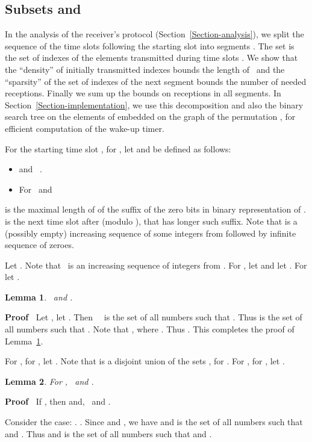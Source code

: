 \documentclass{article}
\newenvironment{proof}{\noindent\textbf{Proof\ }}{\hspace*{\fill}\medskip}
\newtheorem{lemma}{Lemma}
\begin{document}
\subsection{Subsets  and }

In the analysis of the receiver's protocol (Section~\ref{Section-analysis}),
we split the sequence of the time slots following the starting slot  into
segments . The set  is the set of indexes of the
elements transmitted during time slots . We show that the
``density'' of initially transmitted indexes bounds the length of \
 and the ``sparsity'' of the set of indexes of the
next segment bounds the number of needed receptions. Finally we sum up the
bounds on receptions in all segments. In Section~\ref{Section-implementation},
we use this decomposition and also the binary search tree on the elements of
 embedded on the graph of the permutation , for
efficient computation of the wake-up timer.

For the starting time slot , for , let  and  be defined as follows:
\begin{itemize}
  \item   and \ .
  
  \item For   \ and 
\end{itemize}
 is the maximal length of of the suffix of the zero bits in
binary representation of .  
 is the next time slot after   (modulo ),
that has longer such suffix.
Note that  is a (possibly
empty) increasing sequence of some integers from  followed by
infinite sequence of zeroes.

Let . Note that \
 is an increasing sequence
of integers from . For , let  and let . For  let .

\begin{lemma}
  \label{X_i-Lemma} \  and
  .
\end{lemma}

\begin{proof}
  Let , let . Then \  \ is the set of all numbers  such that .
  Thus  is the set of all numbers
   such that . Note that , where
  . Thus . This
  completes the proof of Lemma~\ref{X_i-Lemma}.
\end{proof}

For , for , let
. Note that  is a disjoint union of the sets , for . For , for , let .

\begin{lemma}
  \label{X_il-Lemma} For , \  and .
\end{lemma}

\begin{proof}
  If , then  and, \  and
  .
  
  Consider the case: . . Since  and , we have  and  is the set of all
  numbers  such
  that  and .
  Thus  and  is the set of all numbers  such that  and . 
\end{proof}
\end{document}
